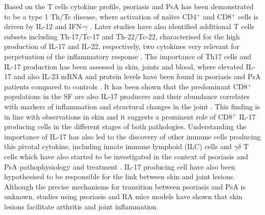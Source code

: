 Based on the T cells cytokine profile, psoriasis and PsA has been demonstrated to be a type 1 Th/Tc disease, where activation of na\"{i}ive CD4$^{+}$ and CD8$^{+}$ cells is driven by IL-12 and IFN-$\gamma$ \parencite{Austin1999,Perera2012}. Later studies have also identified additional T cells subsets including Th-17/Tc-17 and Th-22/Tc-22, characterised for the high production of IL-17 and IL-22, respectively, two cytokines very relevant for perpetuation of the inflammatory response \parencite{Mahil2016}.  The importance of Th17 cells and IL-17 production has been assessed in skin, joints and blood, where elevated IL-17 and also IL-23 mRNA and protein levels have been found in psoriasis and PsA patients compared to controls \parencite{Cai2012, Dolcino2015}. It has been shown that the predominant CD8$^{+}$ populations in the SF are also IL-17 producers and their abundance correlates with markers of inflammation and structural changes in the joint \parencite{Menon2014}. This finding is in line with observations in skin and it suggests a prominent role of CD8$^{+}$ IL-17 producing cells in the different stages of both pathologies. Understanding the importance of IL-17 has also led to the discovery of other immune cells producing this pivotal cytokine, including innate immune lymphoid (ILC) cells and $\gamma$$\delta$ T cells which have also started to be investigated in the context of psoriasis and PsA pathophysiology and treatment \parencite{Meglio2014,Leijten2015}. IL-17 producing cell have also been hypothesised to be responsible for the link between skin and joint lesions. Although the precise mechanisms for transition between psoriasis and PsA is unknown, studies using psoriasis and RA mice models have shown that skin lesions facilitate arthritis and joint inflammation %

